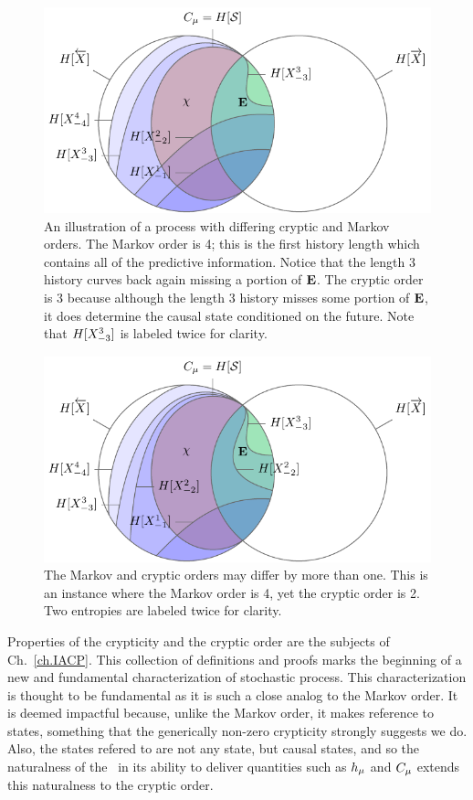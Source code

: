 \begin{figure}[h!]
\centering
\includegraphics[scale = 1.2]{../chapter1/figures/tikz/FoliationCryptic}
\caption{An illustration of a process with differing cryptic and Markov orders. The Markov order is 4; this is the first history length which contains all of the predictive information. Notice that the length 3 history curves back again missing a portion of ${\bf E}$. The cryptic order is 3 because although the length 3 history misses some portion of ${\bf E}$, it does determine the causal state conditioned on the future. Note that $H[{X}_{-3}^3]$ is labeled twice for clarity.}
\label{fig:FoliationCryptic}
\end{figure}

\begin{figure}[h!]
\centering
\includegraphics[scale = 1.2]{../chapter1/figures/tikz/FoliationCrypticRgegek}
\caption{The Markov and cryptic orders may differ by more than one. This is an instance where the Markov order is 4, yet the cryptic order is 2. Two entropies are labeled twice for clarity.}
\label{fig:FoliationCrypticRgegek}
\end{figure}

Properties of the crypticity and the cryptic order are the subjects of Ch.~\ref{ch.IACP}. This collection of definitions and proofs marks the beginning of a new and fundamental characterization of stochastic process. This characterization is thought to be fundamental as it is such a close analog to the Markov order. It is deemed impactful because, unlike the Markov order, it makes reference to states, something that the generically non-zero crypticity strongly suggests we do. Also, the states refered to are not any state, but causal states, and so the naturalness of the \eM\ in its ability to deliver quantities such as $h_\mu$ and $C_\mu$ extends this naturalness to the cryptic order.


